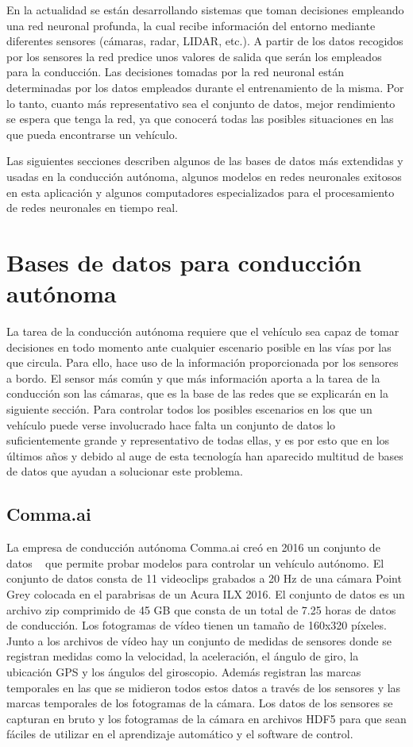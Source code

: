 En la actualidad se están desarrollando sistemas que toman decisiones empleando una red neuronal profunda, la cual recibe información del entorno mediante diferentes sensores (cámaras, radar, LIDAR, etc.). A partir de los datos recogidos por los sensores la red predice unos valores de salida que serán los empleados para la conducción. Las decisiones tomadas por la red neuronal están determinadas por los datos empleados durante el entrenamiento de la misma. Por lo tanto, cuanto más representativo sea el conjunto de datos, mejor rendimiento se espera que tenga la red, ya que conocerá todas las posibles situaciones en las que pueda encontrarse un vehículo.

Las siguientes secciones describen algunos de las bases de datos más extendidas y usadas en la conducción autónoma, algunos modelos en redes neuronales exitosos en esta aplicación y algunos computadores especializados para el procesamiento de redes neuronales en tiempo real.

\section{Bases de datos para conducción autónoma}
\label{sec:datasets}

La tarea de la conducción autónoma requiere que el vehículo sea capaz de tomar decisiones en todo momento ante cualquier escenario posible en las vías por las que circula. Para ello, hace uso de la información proporcionada por los sensores a bordo. El sensor más común y que más información aporta a la tarea de la conducción son las cámaras, que es la base de las redes que se explicarán en la siguiente sección. Para controlar todos los posibles escenarios en los que un vehículo puede verse involucrado hace falta un conjunto de datos lo suficientemente grande y representativo de todas ellas, y es por esto que en los últimos años y debido al auge de esta tecnología han aparecido multitud de bases de datos que ayudan a solucionar este problema.
    
\subsection{Comma.ai}

La empresa de conducción autónoma Comma.ai creó en 2016 un conjunto de datos ~\cite{comma} que permite probar modelos para controlar un vehículo autónomo. El conjunto de datos consta de 11 videoclips grabados a 20 Hz de una cámara Point Grey colocada en el parabrisas de un Acura ILX 2016. El conjunto de datos es un archivo zip comprimido de 45 GB que consta de un total de 7.25 horas de datos de conducción. Los fotogramas de vídeo tienen un tamaño de 160x320 píxeles. Junto a los archivos de vídeo hay un conjunto de medidas de sensores donde se registran medidas como la velocidad, la aceleración, el ángulo de giro, la ubicación GPS y los ángulos del giroscopio.
Además registran las marcas temporales en las que se midieron todos estos datos a través de los sensores y las marcas temporales de los fotogramas de la cámara. Los datos de los sensores se capturan en bruto y los fotogramas de la cámara en archivos HDF5 para que sean fáciles de utilizar en el aprendizaje automático y el software de control.


